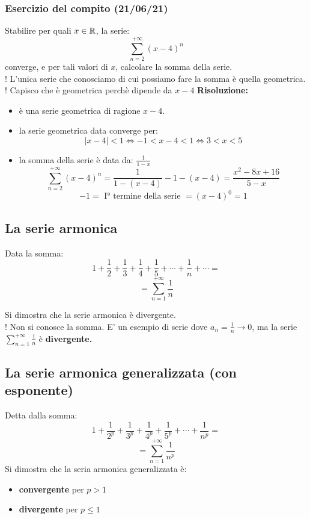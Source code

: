 \documentclass[../main.tex]{subfiles}
\begin{document}
\subsubsection{Esercizio del compito (21/06/21)}
Stabilire per quali $x\in \mathbb{R}$, la serie:
\[
    \sum_{n=2}^{+\infty}(x-4)^n
\]
converge, e per tali valori di $x$, calcolare la somma della serie.\\ ! L'unica
serie che conosciamo di cui possiamo fare la somma è quella geometrica.\\ !
Capisco che è geometrica perchè dipende da $x-4$ \textbf{Risoluzione:}\\
\begin{itemize}
    \item è una serie geometrica di ragione $x-4$.
    \item la serie geometrica data converge per:
          \[
              |x-4|<1 \iff -1<x-4<1 \iff 3<x<5
          \]
    \item la somma della serie è data da: $\frac{1}{1-x}$
          \[
              \sum_{n=2}^{+\infty}(x-4)^n = \frac{1}{1-(x-4)} - 1 - (x-4) = \frac{x^2-8x+16}{5-x}
          \]
          \[
              -1 = \text{ I° termine della serie } = {(x-4)}^0 = 1
          \]
\end{itemize}

\subsection{La serie armonica}
Data la somma:
\[
    1+\frac{1}{2} + \frac{1}{3} + \frac{1}{4} + \frac{1}{5} + \cdots + \frac{1}{n} + \cdots = \]
\[
    = \sum_{n=1}^{+\infty} \frac{1}{n}\]

Si dimostra che la serie armonica è divergente.\\ ! Non si conosce la somma.
 E' un esempio di serie dove $a_n = \frac{1}{n} \to
    0$, ma la serie $\sum_{n=1}^{+\infty}\frac{1}{n}$ è \textbf{divergente.}

\subsection{La serie armonica generalizzata (con esponente)}
Detta dalla somma:
\[
    1+\frac{1}{2^p} + \frac{1}{3^p} + \frac{1}{4^p} + \frac{1}{5^p} + \cdots + \frac{1}{n^p} = \]
\[
    = \sum_{n=1}^{+\infty} \frac{1}{n^p}\]
Si dimostra che la seria armonica generalizzata è:
\begin{itemize}
    \item \textbf{convergente} per $p>1$
    \item \textbf{divergente} per $p\leq 1$
\end{itemize}
\end{document}
